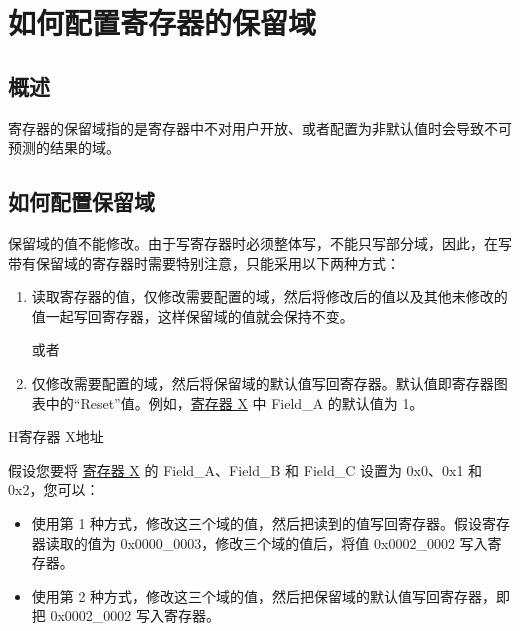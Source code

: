 \section*{如何配置寄存器的保留域}\label{programming-reserved-field}
\rhead{\Navigation}

\subsection*{概述}

寄存器的保留域指的是寄存器中不对用户开放、或者配置为非默认值时会导致不可预测的结果的域。

\subsection*{如何配置保留域}

保留域的值不能修改。由于写寄存器时必须整体写，不能只写部分域，因此，在写带有保留域的寄存器时需要特别注意，只能采用以下两种方式：

\begin{enumerate}
\item 读取寄存器的值，仅修改需要配置的域，然后将修改后的值以及其他未修改的值一起写回寄存器，这样保留域的值就会保持不变。

\noindent 或者

\item 仅修改需要配置的域，然后将保留域的默认值写回寄存器。默认值即寄存器图表中的“Reset”值。例如，\hyperref[fig:registerX]{寄存器 X} 中 Field\_A 的默认值为 1。
\end{enumerate}

\begin{register}{H}{寄存器 X}{地址}\label{fig:registerX}
%
%
%
%
%
\regnewline%

\end{register}

假设您要将 \hyperref[fig:registerX]{寄存器 X} 的 Field\_A、Field\_B 和 Field\_C 设置为 0x0、0x1 和 0x2，您可以：

\begin{itemize}
\item 使用第 1 种方式，修改这三个域的值，然后把读到的值写回寄存器。假设寄存器读取的值为 0x0000\_0003，修改三个域的值后，将值 0x0002\_0002 写入寄存器。
\item 使用第 2 种方式，修改这三个域的值，然后把保留域的默认值写回寄存器，即把 0x0002\_0002 写入寄存器。
\end{itemize}

